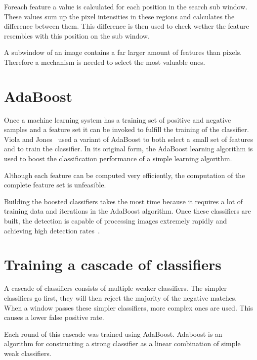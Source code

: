 \documentclass{article}
\begin{document}
\par
Foreach feature a value is calculated for each position in the search sub window. These values sum up the pixel intensities in these regions and calculates the difference between them. This difference is then used to check wether the feature resembles with this position on the sub window.

\par
A subwindow of an image contains a far larger amount of features than pixels. Therefore a mechanism is needed to select the most valuable ones.

\section{AdaBoost}

Once a machine learning system has a training set of positive and negative samples and a feature set it can be invoked to fulfill the training of the classifier. Viola and Jones~\cite{viola2001rapid} used a variant of AdaBoost to both select a small set of features and to train the classifier. In its original form, the AdaBoost learning algorithm is used to boost the classification performance of a simple  learning algorithm.

\par
Although each feature can be computed very efficiently, the computation of the complete feature set is unfeasible.

\par
Building the boosted classifiers takes the most time because it requires a lot of training data and iterations in the AdaBoost algorithm. Once these classifiers are built, the detection is capable of processing images extremely rapidly and achieving high detection rates~\cite{viola2001rapid}.

\section{Training a cascade of classifiers}

A cascade of classifiers consists of multiple weaker classifiers. The simpler classifiers go first, they will then reject the majority of the negative matches. When a window passes these simpler classifiers, more complex ones are used. This causes a lower false positive rate.

Each round of this cascade was trained using AdaBoost. Adaboost is an algorithm for constructing a strong classifier as a linear combination of simple weak classifiers.
\end{document}
